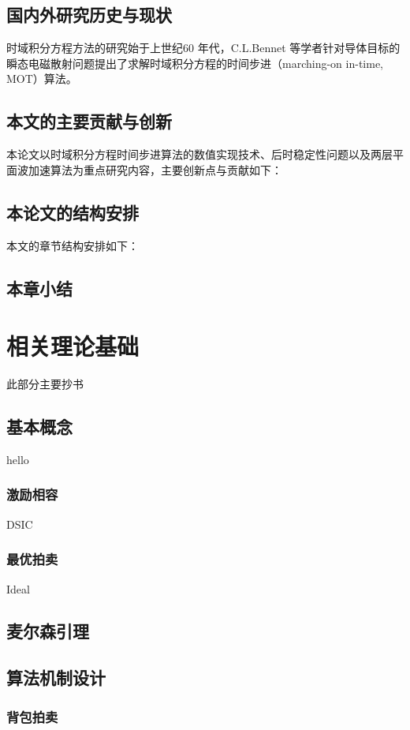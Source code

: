 \documentclass[promaster]{thesis-uestc}
\begin{document}
\section{国内外研究历史与现状}
时域积分方程方法的研究始于上世纪60 年代，C.L.Bennet 等学者针对导体目标的瞬态电磁散射问题提出了求解时域积分方程的时间步进（marching-on in-time, MOT）算法。

\section{本文的主要贡献与创新}
本论文以时域积分方程时间步进算法的数值实现技术、后时稳定性问题以及两层平面波加速算法为重点研究内容，主要创新点与贡献如下：

\section{本论文的结构安排}
本文的章节结构安排如下：

\section{本章小结}

\chapter{相关理论基础}
此部分主要抄书

\section{基本概念}
hello

\subsection{激励相容}
DSIC

\subsection{最优拍卖}
Ideal

\section{麦尔森引理}

\section{算法机制设计}

    \subsection{背包拍卖}
\end{document}
